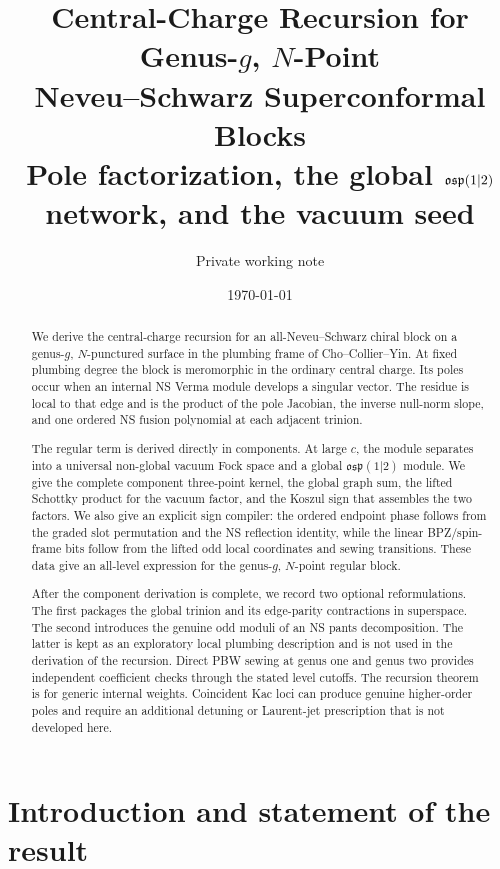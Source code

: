 \documentclass[11pt]{article}
\title{Central-Charge Recursion for Genus-\(g\), \(N\)-Point\\
Neveu--Schwarz Superconformal Blocks\\[0.35em]
\large Pole factorization, the global \(\osp\) network, and the vacuum seed}
\author{Private working note}
\date{\today}
\newcommand{\osp}{\mathfrak{osp}(1|2)}
\begin{document}
\maketitle

\begin{abstract}
We derive the central-charge recursion for an all-Neveu--Schwarz chiral
block on a genus-\(g\), \(N\)-punctured surface in the plumbing frame of
Cho--Collier--Yin.  At fixed plumbing degree the block is meromorphic in the
ordinary central charge.  Its poles occur when an internal NS Verma module
develops a singular vector.  The residue is local to that edge and is the
product of the pole Jacobian, the inverse null-norm slope, and one ordered
NS fusion polynomial at each adjacent trinion.

The regular term is derived directly in components.  At large \(c\), the
module separates into a universal non-global vacuum Fock space and a global
\(\osp\) module.  We give the complete component three-point kernel, the
global graph sum, the lifted Schottky product for the vacuum factor, and the
Koszul sign that assembles the two factors.  We also give an explicit sign
compiler: the ordered endpoint phase follows from the graded slot
permutation and the NS reflection identity, while the linear BPZ/spin-frame
bits follow from the lifted odd local coordinates and sewing transitions.
These data give an all-level expression for the genus-\(g\), \(N\)-point
regular block.

After the component derivation is complete, we record two optional
reformulations.  The first packages the global trinion and its edge-parity
contractions in superspace.  The second introduces the genuine odd moduli of
an NS pants decomposition.  The latter is kept as an exploratory local
plumbing description and is not used in the derivation of the recursion.
Direct PBW sewing at genus one and genus two provides independent
coefficient checks through the stated level cutoffs.  The recursion theorem
is for generic internal weights.  Coincident Kac loci can produce genuine
higher-order poles and require an additional detuning or Laurent-jet
prescription that is not developed here.
\end{abstract}

\tableofcontents

\section*{Introduction and statement of the result}
\end{document}
